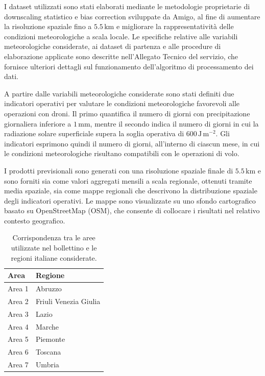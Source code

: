 \documentclass[
	a4paper, %
	12pt, %
]{CSSullivanBusinessReport}
\begin{document}
I dataset utilizzati sono stati elaborati mediante le metodologie proprietarie di downscaling statistico e bias correction sviluppate da Amigo, al fine di aumentare la risoluzione spaziale fino a $5.5\,\mathrm{km}$ e migliorare la rappresentatività delle condizioni meteorologiche a scala locale. Le specifiche relative alle variabili meteorologiche considerate, ai dataset di partenza e alle procedure di elaborazione applicate sono descritte nell’Allegato Tecnico del servizio, che fornisce ulteriori dettagli sul funzionamento dell’algoritmo di processamento dei dati.

A partire dalle variabili meteorologiche considerate sono stati definiti due indicatori operativi per valutare le condizioni meteorologiche favorevoli alle operazioni con droni. Il primo quantifica il numero di giorni con precipitazione giornaliera inferiore a $1\,\mathrm{mm}$, mentre il secondo indica il numero di giorni in cui la radiazione solare superficiale supera la soglia operativa di $600\,\mathrm{J\,m^{-2}}$. Gli indicatori esprimono quindi il numero di giorni, all’interno di ciascun mese, in cui le condizioni meteorologiche risultano compatibili con le operazioni di volo. 

I prodotti previsionali sono generati con una risoluzione spaziale finale di $5.5\,\mathrm{km}$ e sono forniti sia come valori aggregati mensili a scala regionale, ottenuti tramite media spaziale, sia come mappe regionali che descrivono la distribuzione spaziale degli indicatori operativi. Le mappe sono visualizzate su uno sfondo cartografico basato su OpenStreetMap (OSM), che consente di collocare i risultati nel relativo contesto geografico.

\begin{table}[H]
\centering
\begin{tabular}{ll}
\toprule
\textbf{Area} & \textbf{Regione} \\
\midrule
Area 1 & Abruzzo \\
Area 2 & Friuli Venezia Giulia \\
Area 3 & Lazio \\
Area 4 & Marche \\
Area 5 & Piemonte \\
Area 6 & Toscana \\
Area 7 & Umbria \\
\bottomrule
\end{tabular}
\caption{Corrispondenza tra le aree utilizzate nel bollettino e le regioni italiane considerate.}
\label{tab:regioni_aree}
\end{table}
\end{document}
